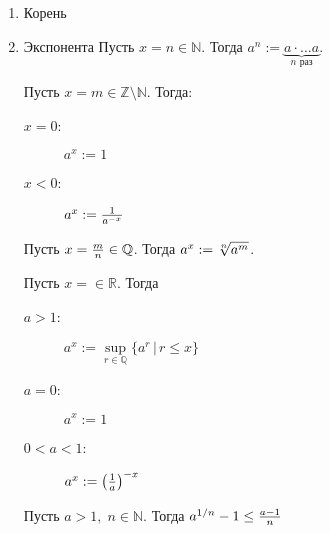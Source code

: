 \documentclass[a4paper,12pt]{article}
\newcommand\R{\mathbb{R}}
\newcommand\Q{\mathbb{Q}}
\newcommand\Z{\mathbb{Z}}
\newcommand\N{\mathbb{N}}
\theoremstyle{plain}
\theoremstyle{definition}
\theoremstyle{remark}
\def\resetdefs{ \setcounter{defn}{0}\setcounter{exmp}{0} }
\def\resetthrm{ \setcounter{thrm}{0}\setcounter{stat}{0} }
\def\resetrem{ \setcounter{rem}{0} }
\def\resetall{ \resetdefs \resetthrm \resetrem}
\begin{document}
\begin{enumerate}
  \item Корень
  \item Экспонента
    \resetall
    {  Пусть $x=n\in\N$. Тогда $a^n := \underbrace{a\cdot\dots a}_{n\text{ раз}}$. }
    {  Пусть $x=m\in\Z\setminus\N$. Тогда:
      \begin{description}
        \item[$x=0$:] $a^x := 1 $
        \item[$x<0$:] $a^x := {1\over a^{-x}}$
      \end{description} }
      {  Пусть $x={m\over n}\in\Q$. Тогда $a^x := \root n \of {a^m}$. }
      {  Пусть $x=\in\R$. Тогда 
        \begin{description}
          \item[$a > 1$:] $a^x := \sup\limits_{r\in\Q}\{a^r\,|\, r\leq x\}$
          \item[$a = 0$:] $a^x := 1$
          \item[$0 < a < 1$:] $a^x := \left({1\over a}\right)^{-x}$
        \end{description}
      }
      
      { \lem\label{lem:varbernineq} Пусть $a>1,\; n\in\N$. Тогда $a^{1/n}-1 \leq {a-1\over n}$ }


\end{enumerate}
\end{document}
